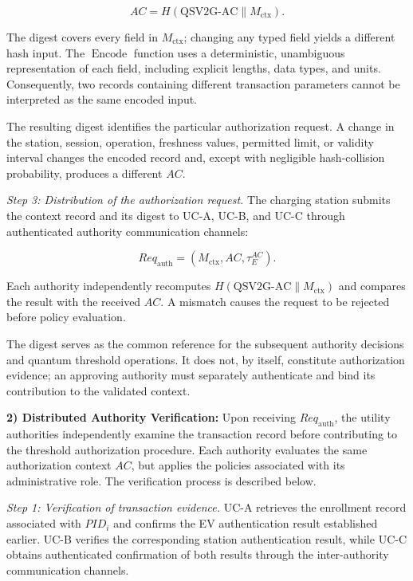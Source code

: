 \documentclass[twocolumn,10pt,journal]{IEEEtran}
\begin{document}
\begin{equation}
AC=
H\left(
\mathrm{QSV2G\mbox{-}AC}
\parallel M_{\mathrm{ctx}}
\right).
\label{eq:qsv2g_context}
\end{equation}

The digest covers every field in $M_{\mathrm{ctx}}$;
changing any typed field yields a different hash input.
The $\operatorname{Encode}$ function uses a
deterministic, unambiguous representation of
each field, including explicit lengths, data
types, and units. Consequently, two records
containing different transaction parameters
cannot be interpreted as the same encoded input.

The resulting digest identifies the particular
authorization request. A change in the station,
session, operation, freshness values, permitted
limit, or validity interval changes the encoded
record and, except with negligible hash-collision
probability, produces a different $AC$.

\textit{Step 3: Distribution of the authorization request.}
The charging station submits the context record
and its digest to UC-A, UC-B, and UC-C through
authenticated authority communication channels:

\begin{equation}
Req_{\mathrm{auth}}
=
(M_{\mathrm{ctx}},AC,\tau_E^{AC}).
\label{eq:qsv2g_authz_request}
\end{equation}

Each authority independently recomputes
$H(\mathrm{QSV2G\mbox{-}AC}\parallel M_{\mathrm{ctx}})$
and compares the result with the received $AC$.
A mismatch causes the request to be rejected
before policy evaluation.

The digest serves as the common reference for
the subsequent authority decisions and quantum
threshold operations. It does not, by itself,
constitute authorization evidence; an approving
authority must separately authenticate and bind
its contribution to the validated context.

\noindent\textbf{2) Distributed Authority Verification:}
Upon receiving $Req_{\mathrm{auth}}$, the utility authorities
independently examine the transaction record before
contributing to the threshold authorization procedure.
Each authority evaluates the same authorization context
$AC$, but applies the policies associated with its
administrative role. The verification process is
described below.

\textit{Step 1: Verification of transaction evidence.}
UC-A retrieves the enrollment record associated with
$PID_i$ and confirms the EV authentication result
established earlier. UC-B verifies the corresponding
station authentication result, while UC-C obtains
authenticated confirmation of both results through
the inter-authority communication channels.
\end{document}
